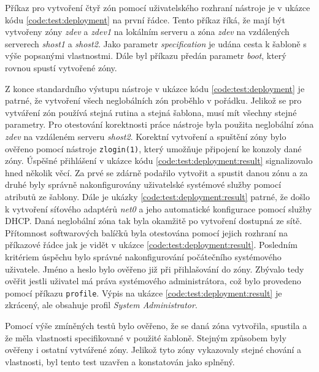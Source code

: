 Příkaz pro vytvoření čtyř zón pomocí uživatelského rozhraní nástroje je v ukázce kódu \ref{code:test:deployment} na první řádce.
Tento příkaz říká, že mají být vytvořeny zóny \textit{zdev} a \textit{zdev1} na lokálním serveru a zóna \textit{zdev} na vzdálených
serverech \textit{shost1} a \textit{shost2}. Jako parametr \textit{specification} je udána cesta k šabloně s výše popsanými 
vlastnostmi. Dále byl příkazu předán parametr \textit{boot}, který rovnou spustí vytvořené zóny.


Z konce standardního výstupu nástroje v ukázce kódu \ref{code:test:deployment} je patrné, že vytvoření všech neglobálních zón
proběhlo v pořádku. Jelikož se pro vytváření zón používá stejná rutina a stejná šablona, musí mít všechny stejné parametry.
Pro otestování korektnosti práce nástroje byla použita neglobální zóna \textit{zdev} na vzdáleném serveru \textit{shost2}.
Korektní vytvoření a spuštění zóny bylo ověřeno pomocí nástroje \verb|zlogin(1)|, který umožňuje připojení ke konzoly dané
zóny. Úspěšné přihlášení v ukázce kódu \ref{code:test:deployment:result} signalizovalo hned několik věcí. Za prvé se zdárně
podařilo vytvořit a spustit danou zónu a za druhé byly správně nakonfigurovány uživatelské systémové služby pomocí atributů ze šablony.
Dále je ukázky \ref{code:test:deployment:result} patrné, že došlo k vytvoření síťového adaptérů \textit{net0} a jeho automatické
konfigurace pomocí služby DHCP. Daná neglobální zóna tak byla okamžitě po vytvoření dostupná ze sítě. Přítomnost softwarových
balíčků byla otestována pomocí jejich rozhraní na příkazové řádce jak je vidět v ukázce \ref{code:test:deployment:result}.
Posledním kritériem úspěchu bylo správné nakonfigurování počátečního systémového uživatele. Jméno a heslo bylo ověřeno již
při přihlašování do zóny. Zbývalo tedy ověřit jestli uživatel má práva systémového administrátora, což bylo provedeno pomocí
příkazu \verb|profile|. Výpis na ukázce \ref{code:test:deployment:result} je zkrácený, ale obsahuje profil \textit{System Administrator}.


Pomocí výše zmíněných testů bylo ověřeno, že se daná zóna vytvořila, spustila a že měla vlastnosti specifikované v použité šabloně.
Stejným způsobem byly ověřeny i ostatní vytvářené zóny. Jelikož tyto zóny vykazovaly stejné chování a vlastnosti, byl tento
test uzavřen a konstatován jako splněný.
